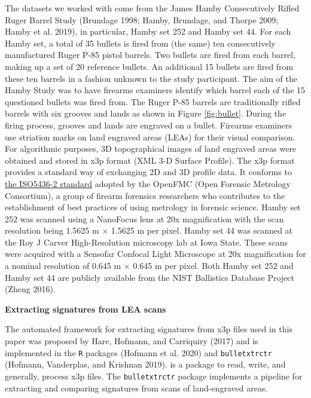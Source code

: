 The datasets we worked with come from the James Hamby Consecutively Rifled Ruger Barrel Study (Brundage 1998; Hamby, Brundage, and Thorpe 2009; Hamby et al. 2019), in particular, Hamby set 252 and Hamby set 44.
For each Hamby set, a total of 35 bullets is fired from (the same) ten consecutively manufactured Ruger P-85 pistol barrels.
Two bullets are fired from each barrel, making up a set of 20 reference bullets.
An additional 15 bullets are fired from these ten barrels in a fashion unknown to the study participant.
The aim of the Hamby Study was to have firearms examiners identify which barrel each of the 15 questioned bullets was fired from.
The Ruger P-85 barrels are traditionally rifled barrels with six grooves and lands as shown in Figure \ref{fig:bullet}.
During the firing process, grooves and lands are engraved on a bullet.
Firearms examiners use striation marks on land engraved areas (LEAs) for their visual comparison.
For algorithmic purposes, 3D topographical images of land engraved areas were obtained and stored in x3p format (XML 3-D Surface Profile).
The x3p format provides a standard way of exchanging 2D and 3D profile data.
It conforms to \href{http://sourceforge.net/p/open-gps/mwiki/X3p/}{the ISO5436-2 standard} adopted by the OpenFMC (Open Forensic Metrology Consortium), a group of firearm forensics researchers who contributes to the establishment of best practices of using metrology in forensic science.
Hamby set 252 was scanned using a NanoFocus lens at 20x magnification with the scan resolution being 1.5625 \textmu m \(\times\) 1.5625 \textmu m per pixel.
Hamby set 44 was scanned at the Roy J Carver High-Resolution microscopy lab at Iowa State.
These scans were acquired with a Sensofar Confocal Light Microscope at 20x magnification for a nominal resolution of 0.645 \textmu m \(\times\) 0.645 \textmu m per pixel.
Both Hamby set 252 and Hamby set 44 are publicly available from the NIST Ballistics Database Project (Zheng 2016).

\textbf{Extracting signatures from LEA scans}

The automated framework for extracting signatures from x3p files used in this paper was proposed by Hare, Hofmann, and Carriquiry (2017) and is implemented in the \texttt{R} packages  (Hofmann et al. 2020) and \texttt{bulletxtrctr} (Hofmann, Vanderplas, and Krishnan 2019).
 is a package to read, write, and generally, process x3p files.
The \texttt{bulletxtrctr} package implements a pipeline for extracting and comparing signatures from scans of land-engraved areas.

